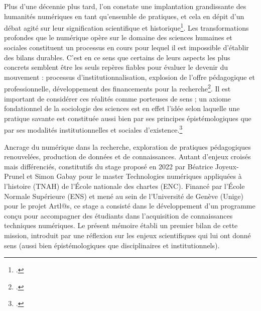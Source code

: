 \documentclass[a4paper,12pt,twoside]{book}
\begin{document}
Plus d'une décennie plus tard, l'on constate une implantation grandissante des humanités numériques en tant qu'ensemble de pratiques, et cela en dépit d'un débat agité sur leur signification scientifique et historique\footcite[ "Au cœur du débat sur les humanités numériques, il y a une question récurrente, et même permanente : celle de la définition. Les digital humanities désignent-elles en propre certaines pratiques, des méthodes, une discipline ? De l’aveu de certains praticiens, le terme constitue une sorte de « signifiant flottant ». La communauté propose des réponses à cette question, mais il me semble problématique d’unifier le domaine hors de références à une école, à une pensée ou à un contexte précis. Une bonne réponse serait historique et tiendrait compte des stratégies institutionnelles."]{berraFaireHumanitesNumeriques2012}. Les transformations profondes que le numérique opère sur le domaine des sciences humaines et sociales constituent un processus en cours pour lequel il est impossible d'établir des bilans durables. C'est en ce sens que certains de leurs aspects les plus concrets semblent être les seuls repères fiables pour évaluer le devenir du mouvement : processus d'institutionnalisation, explosion de l'offre pédagogique et professionnelle, développement des financements pour la recherche\footcite{tessierIntroductionEnseignerApprendre2022}. Il est important de considérer ces réalités comme porteuses de sens ; un axiome fondationnel de la sociologie des sciences est en effet l'idée selon laquelle une pratique savante est constituée aussi bien par ses principes épistémologiques que par ses modalités institutionnelles et sociales d'existence.\footcite{kuhnStructureScientificRevolutions1970, lenoirDisciplineNatureNature2022}

Ancrage du numérique dans la recherche, exploration de pratiques pédagogiques renouvelées, production de données et de connaissances. Autant d'enjeux croisés mais différenciés, constitutifs du stage proposé en 2022 par Béatrice Joyeux-Prunel et Simon Gabay pour le master Technologies numériques appliquées à l'histoire (TNAH) de l'École nationale des chartes (ENC). Financé par l'École Normale Supérieure (ENS) et mené au sein de l'Université de Genève (Unige) pour le projet Artl@s, ce stage a consisté dans le développement d'un programme conçu pour accompagner des étudiants dans l'acquisition de connaissances techniques numériques. Le présent mémoire établi un premier bilan de cette mission, introduit par une réflexion sur les enjeux scientifiques qui lui ont donné sens (aussi bien épistémologiques que disciplinaires et institutionnels).
\end{document}
